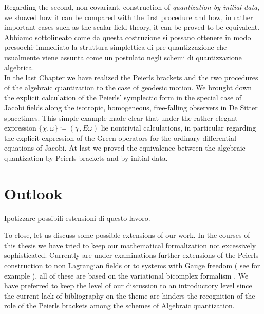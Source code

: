 \documentclass[Main]{subfiles}
\begin{document}
Regarding the second, non covariant, construction of \emph{quantization by initial data}, we showed how it can be compared with the first procedure and how, in rather important cases such as the scalar field theory, it can be proved to be equivalent.
\ifToninus
Abbiamo sottolineato come da questa costruzione si possano ottenere in modo pressochè immediato la struttura simplettica di pre-quantizzazione che usualmente viene assunta come un postulato negli schemi di quantizzazione algebrica.
\fi
\\
In the last Chapter we have realized the Peierls brackets and the two procedures of the algebraic quantization to the case of geodesic motion.
We brought down the explicit calculation of the Peierls' symplectic form in the special case of Jacobi fields along the isotropic, homogeneous, free-falling  observers in De Sitter spacetimes. This simple example made clear that under the rather elegant expression $\{\chi, \omega\} \coloneqq ( \chi, E \omega)$ lie nontrivial calculations, in particular regarding the explicit expression of the Green operators for the ordinary differential equations of Jacobi.
At last we proved the equivalence between the algebraic quantization by Peierls brackets and by initial data.

\vspace{2mm}%

\ifToninus
\section{Outlook}
Ipotizzare possibili estensioni di questo lavoro.

\fi
To close, let us discuss  some possible extensions of our work.
	In the courses of this thesis we have tried to keep our mathematical formalization not excessively sophisticated. 
	Currently are under examinations further extensions of the Peierls construction to non Lagrangian fields or to systems with Gauge freedom ( see for example \cite{Khavkine} ), all of these are based on the variational bicomplex formalism \cite{G.Sardanashvily2013}.
	We have preferred to keep the level of our discussion to an introductory level since the current lack of bibliography on the theme are hinders the recognition of the role of the Peierls brackets among the schemes of Algebraic quantization.
	
\end{document}
